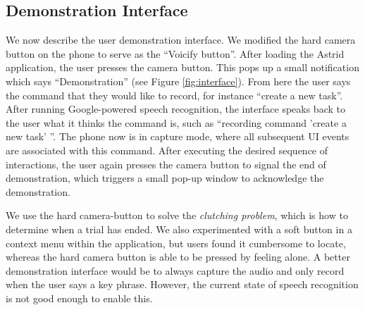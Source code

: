 \documentclass[letterpaper]{article}
\newcommand{\remove}[1]{}
\begin{document}
\remove{Recording demonstrations at this low-level is the source of some errors. For instance, imagine
the user demonstrates how to click the 'save' button on a screen with a list. If the user later adds elements to the
list and tries to play back the 'save' command, the button might have moved. This is a large source of error in 
our experiments.}



\subsection{Demonstration Interface}
We now describe the user demonstration interface. We modified the hard camera button on the phone to serve as the 
``Voicify button''. After loading the Astrid application, the user presses the camera button. This pops up a small
notification which says ``Demonstration'' (see Figure \ref{fig:interface}). From here the user says the command that they would like to record,
for instance ``create a new task''.
After running Google-powered speech recognition, the interface speaks back to the user what it thinks the command
is, such as ``recording command 'create a new task' ''. The phone now is in capture mode, where all subsequent
UI events are associated with this command. After executing the desired sequence of interactions, the user
again presses the camera button to signal the end of demonstration, which triggers a small pop-up window
to acknowledge the demonstration.

We use the hard camera-button to solve the \emph{clutching problem}, which is how to determine when a trial has ended.
We also experimented with a soft button in a context menu within the application, but users found it cumbersome
to locate, whereas the hard camera button is able to be pressed by feeling alone.
A better demonstration interface would be to always capture the audio and only record when the 
user says a key phrase. However, the current state of speech recognition is not good enough to enable this.
\end{document}
